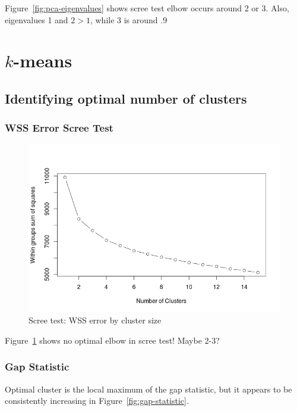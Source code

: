 \documentclass[letterpaper,12pt]{article}
\begin{document}
Figure~\ref{fig:pca-eigenvalues} shows scree test elbow occurs around 2 or 3. Also, eigenvalues 1 and $2 > 1$, while 3
is around .9

\clearpage
\section{$k$-means}
\subsection{Identifying optimal number of clusters}

\subsubsection{WSS Error Scree Test}

\begin{figure}[h]
  \centering
  \includegraphics[width=\linewidth]{kmeans-wss-error.png}
  \caption{Scree test: WSS error by cluster size}
  \label{fig:kmeans-wss-error}
\end{figure}

Figure~\ref{fig:kmeans-wss-error} shows no optimal elbow in scree test! Maybe 2-3?

\subsubsection{Gap Statistic}

Optimal cluster is the local maximum of the gap statistic, but it appears to be
consistently increasing in Figure~\ref{fig:gap-statistic}.
\end{document}
